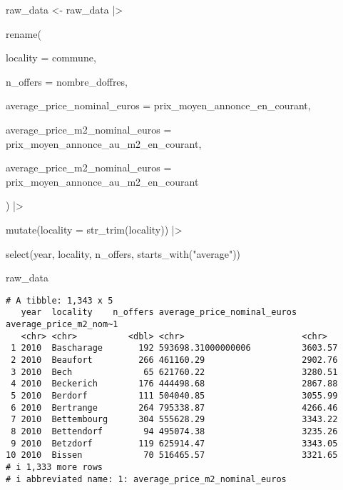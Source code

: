 \documentclass[
  letterpaper,
  DIV=11,
  numbers=noendperiod]{scrartcl}
\newenvironment{Shaded}{\begin{snugshade}}{\end{snugshade}}
\newcommand{\AttributeTok}[1]{\textcolor[rgb]{0.40,0.45,0.13}{#1}}
\newcommand{\FunctionTok}[1]{\textcolor[rgb]{0.28,0.35,0.67}{#1}}
\newcommand{\NormalTok}[1]{\textcolor[rgb]{0.00,0.23,0.31}{#1}}
\newcommand{\OtherTok}[1]{\textcolor[rgb]{0.00,0.23,0.31}{#1}}
\newcommand{\SpecialCharTok}[1]{\textcolor[rgb]{0.37,0.37,0.37}{#1}}
\newcommand{\StringTok}[1]{\textcolor[rgb]{0.13,0.47,0.30}{#1}}
\begin{document}
\begin{Shaded}
\begin{Highlighting}[]
\NormalTok{raw\_data }\OtherTok{\textless{}{-}}\NormalTok{ raw\_data }\SpecialCharTok{|\textgreater{}}

  \FunctionTok{rename}\NormalTok{(}

    \AttributeTok{locality =}\NormalTok{ commune,}

    \AttributeTok{n\_offers =}\NormalTok{ nombre\_doffres,}

    \AttributeTok{average\_price\_nominal\_euros =}\NormalTok{ prix\_moyen\_annonce\_en\_courant,}

    \AttributeTok{average\_price\_m2\_nominal\_euros =}\NormalTok{ prix\_moyen\_annonce\_au\_m2\_en\_courant,}

    \AttributeTok{average\_price\_m2\_nominal\_euros =}\NormalTok{ prix\_moyen\_annonce\_au\_m2\_en\_courant}

\NormalTok{  ) }\SpecialCharTok{|\textgreater{}}

  \FunctionTok{mutate}\NormalTok{(}\AttributeTok{locality =} \FunctionTok{str\_trim}\NormalTok{(locality)) }\SpecialCharTok{|\textgreater{}}

  \FunctionTok{select}\NormalTok{(year, locality, n\_offers, }\FunctionTok{starts\_with}\NormalTok{(}\StringTok{"average"}\NormalTok{))}
\end{Highlighting}
\end{Shaded}

\begin{Shaded}
\begin{Highlighting}[]
\NormalTok{raw\_data}
\end{Highlighting}
\end{Shaded}

\begin{verbatim}
# A tibble: 1,343 x 5
   year  locality    n_offers average_price_nominal_euros average_price_m2_nom~1
   <chr> <chr>          <dbl> <chr>                       <chr>                 
 1 2010  Bascharage       192 593698.31000000006          3603.57               
 2 2010  Beaufort         266 461160.29                   2902.76               
 3 2010  Bech              65 621760.22                   3280.51               
 4 2010  Beckerich        176 444498.68                   2867.88               
 5 2010  Berdorf          111 504040.85                   3055.99               
 6 2010  Bertrange        264 795338.87                   4266.46               
 7 2010  Bettembourg      304 555628.29                   3343.22               
 8 2010  Bettendorf        94 495074.38                   3235.26               
 9 2010  Betzdorf         119 625914.47                   3343.05               
10 2010  Bissen            70 516465.57                   3321.65               
# i 1,333 more rows
# i abbreviated name: 1: average_price_m2_nominal_euros
\end{verbatim}
\end{document}
